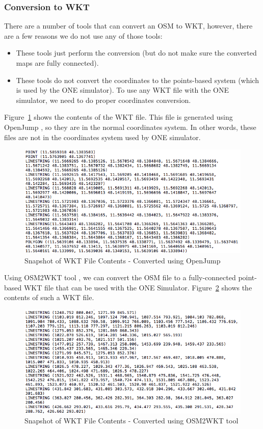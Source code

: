 	\subsubsection{Conversion to WKT}
	There are a number of tools that can convert an OSM to WKT, however, there are a few reasons we do not use any of those tools:
	\begin{itemize}
 	 \item These tools just perform the conversion (but do not make sure the converted maps are fully connected).
   	 \item These tools do not convert the coordinates to the points-based system (which is used by the ONE simulator). To use any WKT file with the ONE simulator, we need to do proper coordinates conversion.
	\end{itemize}
	\vspace{3mm}
	Figure~\ref{fig:wkt-file} shows the contents of the WKT file. This file is generated using OpenJump \cite{openjump}, so they are in the normal coordinates system. In other words, these files are not in the coordinates system used by ONE simulator.
	\vspace{2mm}
	\begin{figure}[H]
		\centering
		\includegraphics[scale=0.45]{./figures/wkt-file-2}
		\caption{Snapshot of WKT File Contents - Converted using OpenJump \cite{openjump} }
		\label{fig:wkt-file}
	\end{figure}
	Using OSM2WKT tool \cite{mayer2010osm}, we can convert the OSM file to a fully-connected point-based WKT file that can be used with the ONE Simulator. Figure~\ref{fig:wkt-file-for-one} shows the contents of such a WKT file.
	\vspace{2mm}
	\begin{figure}[H]
		\centering
		\includegraphics[scale=0.45]{./figures/wkt-file-1}
		\caption{Snapshot of WKT File Contents - Converted using OSM2WKT tool \cite{mayer2010osm} }
		\label{fig:wkt-file-for-one}
	\end{figure}
